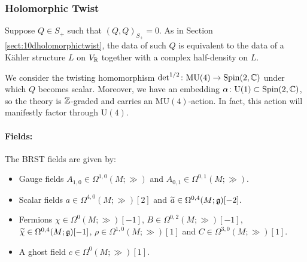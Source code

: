 \documentclass[10pt, oneside]{article}
\newcommand{\MU}{\mathrm{MU}}
\renewcommand{\U}{\mathrm{U}}
\begin{document}
\subsubsection{Holomorphic Twist}
\label{sect:8dholomorphictwist}

Suppose $Q\in S_+$ such that $(Q, Q)_{S_+}=0$. As in Section \ref{sect:10dholomorphictwist}, the data of such $Q$ is equivalent to the data of a K\"ahler structure $L$ on $V_\mathbb R$ together with a complex half-density on $L$.

We consider the twisting homomorphism $\det^{1/2}\colon \MU(4)\rightarrow \Spin(2, \CC)$ under which $Q$ becomes scalar. Moreover, we have an embedding $\alpha\colon \U(1)\subset\Spin(2, \CC)$, so the theory is $\mathbb Z$-graded and carries an $\MU(4)$-action. In fact, this action will manifestly factor through $\U(4)$.

\vspace{-10pt}
\paragraph{Fields:} The BRST fields are given by:
\begin{itemize}
\item Gauge fields $A_{1, 0}\in\Omega^{1, 0}(M; \gg)$ and $A_{0, 1}\in\Omega^{0, 1}(M; \gg)$.
\item Scalar fields $a\in\Omega^{4,0}(M; \gg)[2]$ and $\widetilde{a}\in\Omega^{0, 4}(M; \mathfrak{g})[-2]$.
\item Fermions $\chi\in\Omega^0(M; \gg)[-1]$, $B\in\Omega^{0, 2}(M; \gg)[-1]$, $\widetilde{\chi}\in\Omega^{0, 4}(M; \mathfrak{g})[-1]$, $\rho\in\Omega^{1, 0}(M; \gg)[1]$ and $C\in\Omega^{3,0}(M; \gg)[1]$.
\item A ghost field $c\in \Omega^0(M; \gg)[1]$.
\end{itemize}
\end{document}
